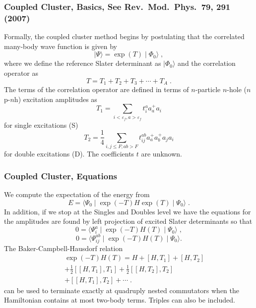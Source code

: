 \documentclass[compress]{beamer}
\begin{document}
\frame
{
  \frametitle{Coupled Cluster, Basics, See Rev.~Mod.~Phys.~79, 291 (2007)}
\begin{small}
{\scriptsize
Formally, the coupled cluster method begins by postulating that 
the correlated many-body wave function is given by 
\[
\mid \Psi \rangle = \exp\left(T\right)\mid \Phi_0\rangle  \;,
\]
where we define the reference Slater determinant as $\mid\Phi_0\rangle$
and the correlation operator as 
\[
T=T_1 + T_2 + T_3 + \cdots + T_A \;. 
 \]
The terms of the correlation operator are defined in terms of 
$n$-particle $n$-hole ($n$p-$n$h) excitation amplitudes as 
\[
T_1 = \sum_{i<\varepsilon_f,a>\varepsilon_f} t^a_i a^+_a a_i 
\]
for single excitations (S)
\[
T_2 = \frac{1}{4}\sum_{i,j\le F; ab > F}t^{ab}_{ij}a^+_a a^+_b a_j a_i
\]
for double excitations (D). The coefficients $t$ are unknown.
}
\end{small}
}

\frame
{
  \frametitle{Coupled Cluster, Equations}
\begin{small}
{\scriptsize
We compute the expectation of the energy from 
\[
E=\langle\Psi_0\mid \exp\left(-T\right) H \exp\left(T\right)
\mid\Psi_0\rangle\;. 
\]
In addition, if we stop at the Singles and Doubles level we have
the equations for the amplitudes are found by left projection of 
excited Slater determinants
so that 
\[
0 = \langle\Psi_i^a\mid 
\exp\left(-T\right) H \left(T\right) \mid \Psi_0\rangle\;, \]
\[
0 =
\langle\Psi_{ij}^{ab}\mid 
\exp\left(-T\right) H \left(T\right) \mid \Psi_0\rangle.
\]
The Baker-Campbell-Hausdorf relation 
\begin{eqnarray}
& & \exp\left(-T\right) H \left(T\right)=
H+\left[H,T_1\right]+\left[H,T_2\right] \nonumber \\ \nonumber
& &+\frac{1}{2}\left[\left[H,T_1\right],T_1\right] 
+\frac{1}{2}\left[\left[H,T_2\right],T_2\right] \nonumber \\ \nonumber
& &+\left[\left[H,T_1\right],T_2\right]+\cdots \nonumber\;.
\end{eqnarray}
can be used to  terminate exactly at quadruply nested commutators  when
the Hamiltonian contains at most two-body terms.   Triples can also be included.
}
\end{small}
}
\end{document}
